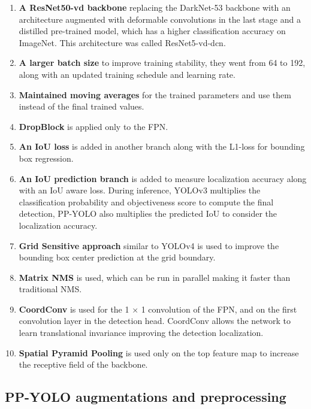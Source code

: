 \documentclass{article}
\begin{document}
\begin{enumerate}
    \item \textbf{A ResNet50-vd backbone} replacing the DarkNet-53 backbone with an architecture augmented with deformable convolutions \cite{dai2017deformable} in the last stage and a distilled pre-trained model, which has a higher classification accuracy on ImageNet. This architecture was called ResNet5-vd-dcn.
    \item \textbf{A larger batch size} to improve training stability, they went from 64 to 192, along with an updated training schedule and learning rate.
    \item \textbf{Maintained moving averages} for the trained parameters and use them instead of the final trained values.
    \item \textbf{DropBlock} is applied only to the FPN.
    \item \textbf{An IoU loss} is added in another branch along with the L1-loss for bounding box regression.
    \item \textbf{An IoU prediction branch} is added to measure localization accuracy along with an IoU aware loss. During inference, YOLOv3 multiplies the classification probability and objectiveness score to compute the final detection, PP-YOLO also multiplies the predicted IoU to consider the localization accuracy.
    \item \textbf{Grid Sensitive approach} similar to YOLOv4 is used to improve the bounding box center prediction at the grid boundary.
    \item \textbf{Matrix NMS} \cite{xinlong2020solov2} is used, which can be run in parallel making it faster than traditional NMS.
    \item \textbf{CoordConv} \cite{liu2018intriguing} is used for the 1 × 1 convolution of the FPN, and on the first convolution layer in the detection head. CoordConv allows the network to learn translational invariance improving the detection localization.
    \item \textbf{Spatial Pyramid Pooling} is used only on the top feature map to increase the receptive field of the backbone.
\end{enumerate}



\subsection{PP-YOLO augmentations and preprocessing}

\end{document}
